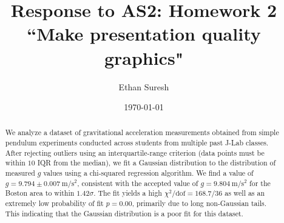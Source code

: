 \usepackage{graphicx}      %
\usepackage{bm}            %
\usepackage[colorlinks=true]{hyperref}  %




\title{Response to AS2: Homework 2 ``Make presentation quality graphics"}
\author{Ethan Suresh}
\date{\today}


\begin{abstract}
We analyze a dataset of gravitational acceleration measurements obtained from simple pendulum
experiments conducted across students from multiple past J-Lab classes.
After rejecting outliers using an interquartile-range criterion (data points must be within $10$ IQR from the median), we fit a Gaussian distribution to the
distribution of measured $g$ values using a chi-squared regression algorithm.
We find a value of $g = 9.794 \pm 0.007\ \mathrm{m/s^2}$, consistent with the accepted value of
$g = 9.804\ \mathrm{m/s^2}$ for the Boston area to within $1.42 \sigma$.
The fit yields a high $\chi^2/\mathrm{dof} = 168.7/36$ as well as an extremely low probability of fit $p = 0.00$, primarily due to long non-Gaussian tails. This 
indicating that the Gaussian distribution is a poor fit for this dataset.
\end{abstract}

\maketitle




